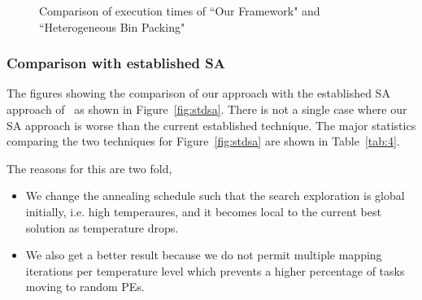 \begin{figure}[t!]
{    \label{fig:gram1ho}
  }
  \caption{Comparison of execution times of ``Our Framework" and
    ``Heterogeneous Bin Packing"}
  \label{fig:ho}
\end{figure}


\subsubsection{Comparison with established SA}
\label{sec:comp-with-establ}

The figures showing the comparison of our approach with the established
SA approach of~\cite{hors06} as shown in Figure~\ref{fig:stdsa}. There
is not a single case where our SA approach is worse than the current
established technique. The major statistics comparing the two techniques
for Figure~\ref{fig:stdsa} are shown in Table~\ref{tab:4}.

The reasons for this are two fold,
\begin{itemize}
\item We change the annealing schedule such that the search exploration is
global initially, i.e. high temperaures, and it becomes local to the current
best solution as temperature drops.
\item We also get a better result because we do not permit multiple mapping
iterations per temperature level which prevents a higher percentage of tasks
moving to random PEs. 
\end{itemize}

